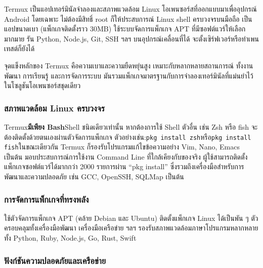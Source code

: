 


Termux เป็นแอปเทอร์มินัลจำลองและสภาพแวดล้อม Linux โอเพนซอร์สที่ออกแบบมาเพื่ออุปกรณ์ Android โดยเฉพาะ ไม่ต้องมีสิทธิ์ root ก็ให้ประสบการณ์ Linux shell ครบวงจรบนมือถือ เป็นแอปขนาดเบา (แพ็กเกจติดตั้งราว 30MB) ใช้ระบบจัดการแพ็กเกจ APT ที่มีซอฟต์แวร์ให้เลือกมากมาย รัน Python, Node.js, Git, SSH ฯลฯ บนอุปกรณ์เคลื่อนที่ได้ จะตั้งเซิร์ฟเวอร์หรือทำเพนเทสต์ก็ยังได้

จุดแข็งหลักของ Termux คือความเบาและความยืดหยุ่นสูง เหมาะกับหลากหลายสถานการณ์ ทั้งงานพัฒนา การเรียนรู้ และการจัดการระบบ มันรวมแพ็กเกจมาตรฐานกับการจำลองเทอร์มินัลที่แม่นยำไว้ในโซลูชันโอเพนซอร์สชุดเดียว


\subsubsection*{สภาพแวดล้อม Linux ครบวงจร}

Termux\textbf{มีเพียง Bash}Shell ชนิดเดียวเท่านั้น หากต้องการใช้ Shell ตัวอื่น เช่น Zsh หรือ fish จะต้องติดตั้งด้วยตนเองผ่านตัวจัดการแพ็กเกจ ตัวอย่างเช่น:\texttt{pkg install zsh}หรือ\texttt{pkg install fish}ในขณะเดียวกัน Termux ก็รองรับโปรแกรมแก้ไขข้อความอย่าง Vim, Nano, Emacs เป็นต้น มอบประสบการณ์การใช้งาน Command Line ที่ใกล้เคียงกับของจริง ผู้ใช้สามารถติดตั้งแพ็กเกจซอฟต์แวร์ได้มากกว่า 2000 รายการผ่าน “pkg install” ซึ่งรวมถึงเครื่องมือสำหรับการพัฒนาและความปลอดภัย เช่น GCC, OpenSSH, SQLMap เป็นต้น

\subsubsection*{การจัดการแพ็กเกจที่ทรงพลัง}

ใช้ตัวจัดการแพ็กเกจ APT (คล้าย Debian และ Ubuntu) ติดตั้งแพ็กเกจ Linux ได้เป็นพัน ๆ ตัว ครอบคลุมทั้งเครื่องมือพัฒนา เครื่องมือเครือข่าย ฯลฯ รองรับสภาพแวดล้อมภาษาโปรแกรมหลากหลาย ทั้ง Python, Ruby, Node.js, Go, Rust, Swift

\subsubsection*{ฟังก์ชันความปลอดภัยและเครือข่าย}

